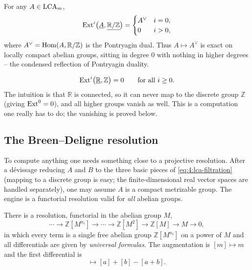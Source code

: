 \begin{example}
\label{ex:4:pontryagin}
For any $A\in\mathrm{LCA}_m$,
\begin{equation*}
\operatorname{Ext}^{i}\bigl(\underline{A},\underline{\mathbb{R}/\mathbb{Z}}\bigr)=
\begin{cases}
A^{\vee} & i=0,\\
0 & i>0,
\end{cases}
\end{equation*}
where $A^{\vee}=\operatorname{Hom}(A,\mathbb{R}/\mathbb{Z})$ is the Pontryagin dual. Thus
$A\mapsto A^{\vee}$ is exact on locally compact abelian groups, sitting in degree
$0$ with nothing in higher degrees -- the condensed reflection of Pontryagin
duality.
\end{example}

\begin{example}
\label{ex:4:R-Z}
\begin{equation*}
\operatorname{Ext}^{i}\bigl(\underline{\mathbb{R}},\mathbb{Z}\bigr)=0\qquad\text{for all }i\geq0.
\end{equation*}
The intuition is that $\mathbb{R}$ is connected, so it can never map to the
discrete group $\mathbb{Z}$ (giving $\operatorname{Ext}^0=0$), and all higher groups vanish as
well. This is a computation one really has to do; the vanishing is proved below.
\end{example}

\subsection{The Breen--Deligne resolution}

To compute anything one needs something close to a projective resolution. After
a d\'evissage reducing $A$ and $B$ to the three basic pieces of
\eqref{eq:4:lca-filtration} (mapping to a discrete group is easy; the
finite-dimensional real vector spaces are handled separately), one may assume $A$
is a compact metrizable group. The engine is a functorial resolution valid for
\emph{all} abelian groups.

\begin{theorem}
\label{thm:4:breen-deligne}
There is a resolution, functorial in the abelian group $M$,
\begin{equation}
\label{eq:4:breen-deligne}
\cdots\to\mathbb{Z}[M^{n_i}]\to\cdots\to\mathbb{Z}[M^{2}]\to\mathbb{Z}[M]\to M\to0,
\end{equation}
in which every term is a single free abelian group $\mathbb{Z}[M^{n_i}]$ on a
power of $M$ and all differentials are given by \emph{universal formulas}. The
augmentation is $[m]\mapsto m$ and the first differential is
\begin{equation*}
[(a,b)]\longmapsto [a]+[b]-[a+b].
\end{equation*}
\end{theorem}

